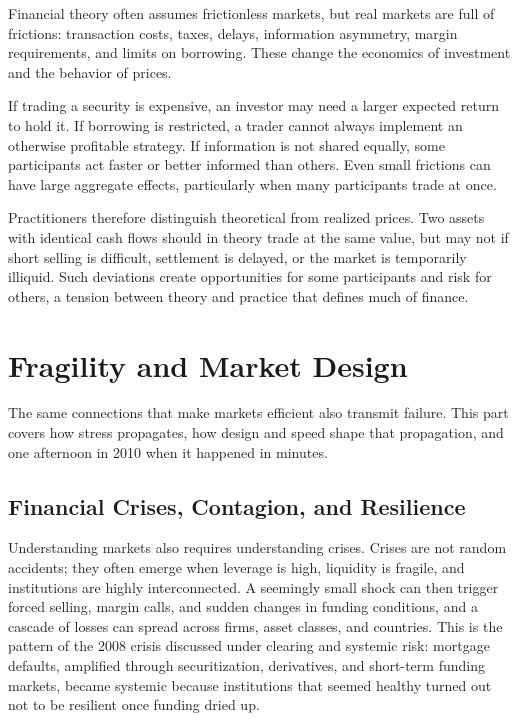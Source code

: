 \documentclass[../ai_in_finance]{subfiles}
\begin{document}
Financial theory often assumes frictionless markets, but real markets are full of frictions: transaction costs, taxes, delays, information asymmetry, margin requirements, and limits on borrowing. These change the economics of investment and the behavior of prices.

If trading a security is expensive, an investor may need a larger expected return to hold it. If borrowing is restricted, a trader cannot always implement an otherwise profitable strategy. If information is not shared equally, some participants act faster or better informed than others. Even small frictions can have large aggregate effects, particularly when many participants trade at once.

Practitioners therefore distinguish theoretical from realized prices. Two assets with identical cash flows should in theory trade at the same value, but may not if short selling is difficult, settlement is delayed, or the market is temporarily illiquid. Such deviations create opportunities for some participants and risk for others, a tension between theory and practice that defines much of finance.

\section{Fragility and Market Design}

The same connections that make markets efficient also transmit failure. This part covers how stress propagates, how design and speed shape that propagation, and one afternoon in 2010 when it happened in minutes.

\subsection{Financial Crises, Contagion, and Resilience}

Understanding markets also requires understanding crises. Crises are not random accidents; they often emerge when leverage is high, liquidity is fragile, and institutions are highly interconnected. A seemingly small shock can then trigger forced selling, margin calls, and sudden changes in funding conditions, and a cascade of losses can spread across firms, asset classes, and countries.
This is the pattern of the 2008 crisis discussed under clearing and systemic risk: mortgage defaults, amplified through securitization, derivatives, and short-term funding markets, became systemic because institutions that seemed healthy turned out not to be resilient once funding dried up.
\end{document}
